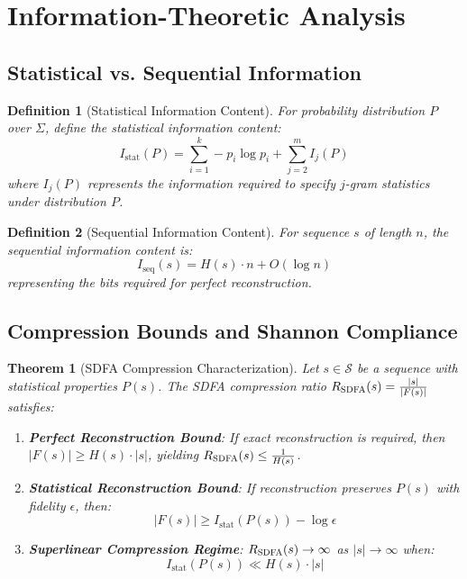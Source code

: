 \documentclass[11pt]{article}
\newtheorem{definition}{Definition}
\newtheorem{theorem}{Theorem}
\newcommand{\sdfa}{\textsc{SDFA}}
\newcommand{\seqspace}{\mathcal{S}}
\newcommand{\alphabet}{\Sigma}
\newcommand{\prob}[1]{P(#1)}
\begin{document}
\section{Information-Theoretic Analysis}

\subsection{Statistical vs. Sequential Information}

\begin{definition}[Statistical Information Content]
For probability distribution $P$ over $\alphabet$, define the statistical information content:
\[I_{\text{stat}}(P) = \sum_{i=1}^k -p_i \log p_i + \sum_{j=2}^m I_j(P)\]
where $I_j(P)$ represents the information required to specify $j$-gram statistics under distribution $P$.
\end{definition}

\begin{definition}[Sequential Information Content]  
For sequence $s$ of length $n$, the sequential information content is:
\[I_{\text{seq}}(s) = H(s) \cdot n + O(\log n)\]
representing the bits required for perfect reconstruction.
\end{definition}

\subsection{Compression Bounds and Shannon Compliance}

\begin{theorem}[SDFA Compression Characterization]
Let $s \in \seqspace$ be a sequence with statistical properties $\prob{s}$. The \sdfa{} compression ratio $R_{\sdfa}(s) = \frac{|s|}{|F(s)|}$ satisfies:

\begin{enumerate}
    \item \textbf{Perfect Reconstruction Bound}: If exact reconstruction is required, then $|F(s)| \geq H(s) \cdot |s|$, yielding $R_{\sdfa}(s) \leq \frac{1}{H(s)}$.
    
    \item \textbf{Statistical Reconstruction Bound}: If reconstruction preserves $\prob{s}$ with fidelity $\epsilon$, then:
    \[|F(s)| \geq I_{\text{stat}}(\prob{s}) - \log \epsilon\]
    
    \item \textbf{Superlinear Compression Regime}: $R_{\sdfa}(s) \to \infty$ as $|s| \to \infty$ when:
    \[I_{\text{stat}}(\prob{s}) \ll H(s) \cdot |s|\]
\end{enumerate}
\end{theorem}
\end{document}
